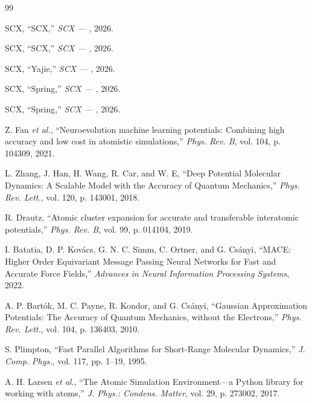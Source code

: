 \documentclass[12pt,a4paper]{article}
\theoremstyle{remark}
\begin{document}
\begin{thebibliography}{99}

SCX, ``SCX,''
\textit{SCX — }, 2026.

SCX, ``SCX,''
\textit{SCX — }, 2026.

SCX, ``Yajie,''
\textit{SCX — }, 2026.

SCX, ``Spring,''
\textit{SCX — }, 2026.

SCX, ``Spring,''
\textit{SCX — }, 2026.

Z. Fan \textit{et al.}, ``Neuroevolution machine learning potentials:
Combining high accuracy and low cost in atomistic simulations,''
\textit{Phys. Rev. B}, vol. 104, p. 104309, 2021.

L. Zhang, J. Han, H. Wang, R. Car, and W. E, ``Deep Potential Molecular Dynamics:
A Scalable Model with the Accuracy of Quantum Mechanics,''
\textit{Phys. Rev. Lett.}, vol. 120, p. 143001, 2018.

R. Drautz, ``Atomic cluster expansion for accurate and transferable interatomic potentials,''
\textit{Phys. Rev. B}, vol. 99, p. 014104, 2019.

I. Batatia, D. P. Kovács, G. N. C. Simm, C. Ortner, and G. Csányi,
``MACE: Higher Order Equivariant Message Passing Neural Networks for
Fast and Accurate Force Fields,''
\textit{Advances in Neural Information Processing Systems}, 2022.

A. P. Bartók, M. C. Payne, R. Kondor, and G. Csányi,
``Gaussian Approximation Potentials: The Accuracy of Quantum Mechanics,
without the Electrons,''
\textit{Phys. Rev. Lett.}, vol. 104, p. 136403, 2010.

S. Plimpton, ``Fast Parallel Algorithms for Short-Range Molecular Dynamics,''
\textit{J. Comp. Phys.}, vol. 117, pp. 1–19, 1995.

A. H. Larsen \textit{et al.}, ``The Atomic Simulation Environment—a Python library
for working with atoms,''
\textit{J. Phys.: Condens. Matter}, vol. 29, p. 273002, 2017.

\end{thebibliography}

\appendix
\end{document}
